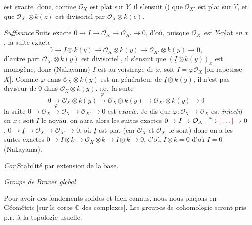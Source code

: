 \documentclass[11pt,a4paper]{article}
\begin{document}

est exacte, donc, comme $\mathcal{O}_X$ est plat sur $Y$, il s'ensuit
() que $\mathcal{O}_{X'}$ est plat sur $Y$, et que
$\mathcal{O}_{X'} \otimes k(z)$ est  divisoriel
par $\mathcal{O}_X \otimes k(z)$.

\emph{Suffisance}
\quad Suite exacte $0 \to \underline{I} \to \mathcal{O}_X \to
\mathcal{O}_{X'} \to 0$, d'où, puisque $\mathcal{O}_{X'}$ est $Y$-plat
\emph{en $x$}, la suite exacte
\[
  0 \to \underline{I} \otimes k(y) \to \mathcal{O}_X \otimes k(y) \to
  \mathcal{O}_{X'} \otimes k(y) \to 0 ,
\]
d'autre part $\mathcal{O}_{X'} \otimes k(y)$ est divisoriel , il
s'ensuit que $(\underline{I} \otimes k(y))_x$ est monogène, donc (Nakayama)
$\underline{I}$ \struck{\ill{}} est \struck{\ill{} \ill{} \ill{}}
 au voisinage de $x$, soit $\underline{I} = \varphi
\mathcal{O}_X$ [on rapetisse $X$]. Comme $\varphi$ dans
$\mathcal{O}_X \otimes k(y)$ est un générateur de $\underline{I} \otimes k(y)$,
il n'est pas diviseur de $0$ dans $\mathcal{O}_X \otimes k(y)$, i.e.\ la suite
\[
  0 \to \mathcal{O}_X \otimes k(y) \xrightarrow{\ \varphi\ }
  \mathcal{O}_X \otimes k(y) \to \mathcal{O}_{X'} \otimes k(y) \to 0
\]
 la suite
$0 \to \mathcal{O}_X \xrightarrow{\ \varphi\ } \mathcal{O}_X \to
\mathcal{O}_{X'} \to 0$ est \emph{exacte}. Je dis que
$\varphi : \mathcal{O}_X \to \mathcal{O}_X$ est \emph{injectif} en $x$ : soit
$I$ le noyau, on aura alors les suites exactes
$0 \to I \to \mathcal{O}_X \xrightarrow{\ \varphi\ } \ill{} \to 0$,
$0 \to \underline{I} \to \mathcal{O}_X \to \mathcal{O}_{X'} \to 0$, où
$\underline{I}$ est plat (car $\mathcal{O}_X$ et $\mathcal{O}_{X'}$ le sont)
donc on a les suites exactes
$0 \to I \otimes k \to \mathcal{O}_X \otimes k \to \underline{I} \otimes k \to
0$, d'où $I \otimes k = 0$ d'où $I = 0$ (Nakayama).

\ill{} \ill{} \emph{Cor} \quad Stabilité par extension de la base.


\emph{Groupe de Brauer global.}

Pour avoir des fondements solides et bien connus, nous nous plaçons en
Géométrie   [sur le corps $\mathbb{C}$ des
complexes]. Les groupes de cohomologie seront pris p.r.\ à la topologie
usuelle.
\end{document}
